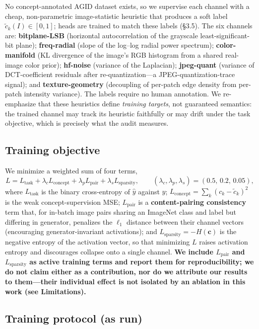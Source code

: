 No concept-annotated AGID dataset exists, so we supervise each channel with a cheap, non-parametric image-statistic heuristic that produces a soft label \(\tilde{c}_k(I)\in[0,1]\); heads are trained to match these labels (\S{}3.5). The six channels are: \textbf{bitplane-LSB} (horizontal autocorrelation of the grayscale least-significant-bit plane); \textbf{freq-radial} (slope of the log--log radial power spectrum); \textbf{color-manifold} (KL divergence of the image's RGB histogram from a shared real-image color prior); \textbf{hf-noise} (variance of the Laplacian); \textbf{jpeg-quant} (variance of DCT-coefficient residuals after re-quantization---a JPEG-quantization-trace signal); and \textbf{texture-geometry} (decoupling of per-patch edge density from per-patch intensity variance). The labels require no human annotation. We re-emphasize that these heuristics define \emph{training targets}, not guaranteed semantics: the trained channel may track its heuristic faithfully or may drift under the task objective, which is precisely what the audit measures.

\subsection{Training objective}

We minimize a weighted sum of four terms, \[L = L_{\text{task}} + \lambda_c L_{\text{concept}} + \lambda_p L_{\text{pair}} + \lambda_s L_{\text{sparsity}},\qquad (\lambda_c,\lambda_p,\lambda_s)=(0.5,\,0.2,\,0.05),\] where \(L_{\text{task}}\) is the binary cross-entropy of \(\hat{y}\) against \(y\); \(L_{\text{concept}}=\sum_{k}(c_k-\tilde{c}_k)^2\) is the weak concept-supervision MSE; \(L_{\text{pair}}\) is a \textbf{content-pairing consistency} term that, for in-batch image pairs sharing an ImageNet class and label but differing in generator, penalizes the \(\ell_1\) distance between their channel vectors (encouraging generator-invariant activations); and \(L_{\text{sparsity}}=-H(\mathbf{c})\) is the negative entropy of the activation vector, so that minimizing \(L\) raises activation entropy and discourages collapse onto a single channel. \textbf{We include \(L_{\text{pair}}\) and \(L_{\text{sparsity}}\) as active training terms and report them for reproducibility; we do not claim either as a contribution, nor do we attribute our results to them---their individual effect is not isolated by an ablation in this work (see Limitations).}

\subsection{Training protocol (as run)}

